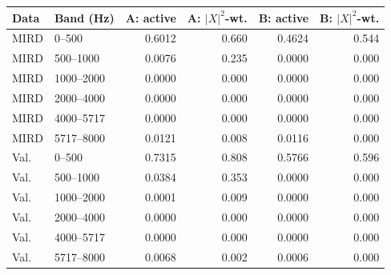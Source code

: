 \begin{tabular}{@{}llrrrr@{}}
\toprule
Data & Band (Hz) & A: active & A: $|X|^2$-wt. & B: active & B: $|X|^2$-wt. \\
\midrule
MIRD & 0--500 & 0.6012 & 0.660 & 0.4624 & 0.544 \\
MIRD & 500--1000 & 0.0076 & 0.235 & 0.0000 & 0.000 \\
MIRD & 1000--2000 & 0.0000 & 0.000 & 0.0000 & 0.000 \\
MIRD & 2000--4000 & 0.0000 & 0.000 & 0.0000 & 0.000 \\
MIRD & 4000--5717 & 0.0000 & 0.000 & 0.0000 & 0.000 \\
MIRD & 5717--8000 & 0.0121 & 0.008 & 0.0116 & 0.000 \\
Val. & 0--500 & 0.7315 & 0.808 & 0.5766 & 0.596 \\
Val. & 500--1000 & 0.0384 & 0.353 & 0.0000 & 0.000 \\
Val. & 1000--2000 & 0.0001 & 0.009 & 0.0000 & 0.000 \\
Val. & 2000--4000 & 0.0000 & 0.000 & 0.0000 & 0.000 \\
Val. & 4000--5717 & 0.0000 & 0.000 & 0.0000 & 0.000 \\
Val. & 5717--8000 & 0.0068 & 0.002 & 0.0006 & 0.000 \\
\bottomrule
\end{tabular}
